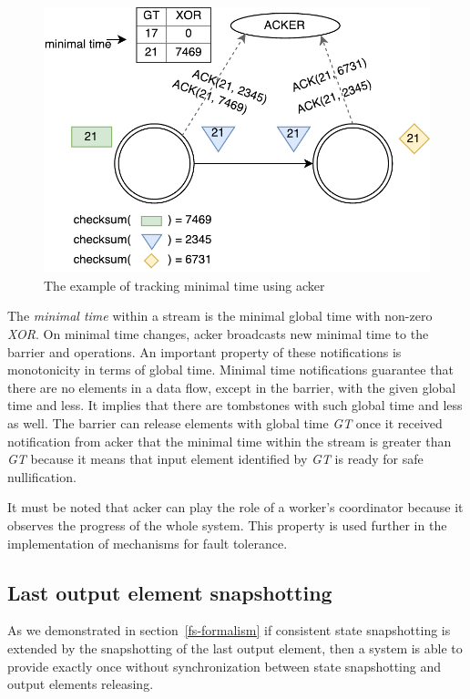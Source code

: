\begin{figure}[htbp]
  \centering
  \includegraphics[scale=0.58]{pics/acker}
  \caption{The example of tracking minimal time using acker}
  \label {acker}
\end{figure}

The {\em minimal time} within a stream is the minimal global time with non-zero {\it XOR}. On minimal time changes, acker broadcasts new minimal time to the barrier and operations. An important property of these notifications is monotonicity in terms of global time. Minimal time notifications guarantee that there are no elements in a data flow, except in the barrier, with the given global time and less. It implies that there are tombstones with such global time and less as well. The barrier can release elements with global time {\it GT} once it received notification from acker that the minimal time within the stream is greater than {\it GT} because it means that input element identified by {\it GT} is ready for safe nullification. 

It must be noted that acker can play the role of a worker's coordinator because it observes the progress of the whole system. This property is used further in the implementation of mechanisms for fault tolerance. 

\subsection{Last output element snapshotting}

As we demonstrated in section~\ref{fs-formalism} if consistent state snapshotting is extended by the snapshotting of the last output element, then a system is able to provide exactly once without synchronization between state snapshotting and output elements releasing. 


